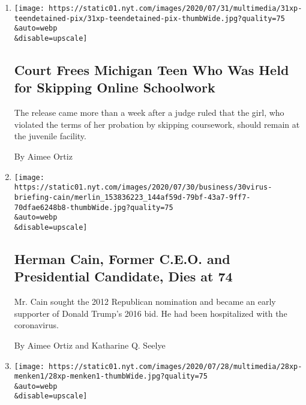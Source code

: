\begin{enumerate}
\def\labelenumi{\arabic{enumi}.}
\item
  \href{/2020/07/31/us/michigan-teen-homework-release.html}{}

  \texttt{[image: https://static01.nyt.com/images/2020/07/31/multimedia/31xp-teendetained-pix/31xp-teendetained-pix-thumbWide.jpg?quality=75\\\&auto=webp\\\&disable=upscale]}

  \hypertarget{court-frees-michigan-teen-who-was-held-for-skipping-online-schoolwork}{%
  \subsection{Court Frees Michigan Teen Who Was Held for Skipping Online
  Schoolwork}\label{court-frees-michigan-teen-who-was-held-for-skipping-online-schoolwork}}

  The release came more than a week after a judge ruled that the girl,
  who violated the terms of her probation by skipping coursework, should
  remain at the juvenile facility.

  By Aimee Ortiz
\item
  \href{/2020/07/30/us/politics/herman-cain-dead.html}{}

  \texttt{[image: https://static01.nyt.com/images/2020/07/30/business/30virus-briefing-cain/merlin\_153836223\_144af59d-79bf-43a7-9ff7-70dfae6248b8-thumbWide.jpg?quality=75\\\&auto=webp\\\&disable=upscale]}

  \hypertarget{herman-cain-former-ceo-and-presidential-candidate-dies-at-74}{%
  \subsection{Herman Cain, Former C.E.O. and Presidential Candidate,
  Dies at
  74}\label{herman-cain-former-ceo-and-presidential-candidate-dies-at-74}}

  Mr. Cain sought the 2012 Republican nomination and became an early
  supporter of Donald Trump's 2016 bid. He had been hospitalized with
  the coronavirus.

  By Aimee Ortiz and Katharine Q. Seelye
\item
  \href{/2020/07/28/arts/alan-menken-egot.html}{}

  \texttt{[image: https://static01.nyt.com/images/2020/07/28/multimedia/28xp-menken1/28xp-menken1-thumbWide.jpg?quality=75\\\&auto=webp\\\&disable=upscale]}

  \hypertarget{with-daytime-emmy-alan-menken-joins-the-elite-egot-club}{%
}
\end{enumerate}
